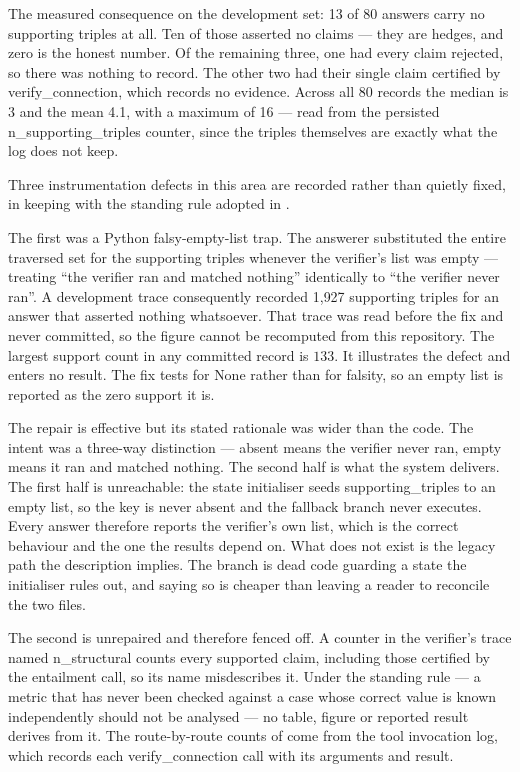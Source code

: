 The measured consequence on the development set: 13 of 80 answers carry no
supporting triples at all. Ten of those asserted no claims --- they are hedges,
and zero is the honest number. Of the remaining three, one had every claim
rejected, so there was nothing to record. The other two had their single
claim certified by \textsf{verify\_connection}, which records no evidence.
Across all 80 records the median is 3 and the mean 4.1, with a maximum of 16 ---
read from the persisted \textsf{n\_supporting\_triples} counter, since the
triples themselves are exactly what the log does not keep.

Three instrumentation defects in this area are recorded rather than quietly
fixed, in keeping with the standing rule adopted in
.

The first was a Python falsy-empty-list trap. The answerer substituted the
entire traversed set for the supporting triples whenever the verifier's list was
empty --- treating ``the verifier ran and matched nothing'' identically to ``the
verifier never ran''. A development trace consequently recorded 1{,}927
supporting triples for an answer that asserted nothing whatsoever. That trace
was read before the fix and never committed, so the figure cannot be recomputed
from this repository. The largest support count in any committed record is
$133$. It illustrates the defect and enters no result. The fix tests for
\textsf{None} rather than for falsity, so an empty list is reported as the zero
support it is.

The repair is effective but its stated rationale was wider than the code. The
intent was a three-way distinction --- absent means the verifier never ran,
empty means it ran and matched nothing. The second half is what the system
delivers. The first half is unreachable: the state initialiser seeds
\textsf{supporting\_triples} to an empty list, so the key is never absent and
the fallback branch never executes. Every answer therefore reports the
verifier's own list, which is the correct behaviour and the one the results
depend on. What does not exist is the legacy path the description implies. The
branch is dead code guarding a state the initialiser rules out, and saying so is
cheaper than leaving a reader to reconcile the two files.

The second is unrepaired and therefore fenced off. A counter in the verifier's
trace named \textsf{n\_structural} counts every supported claim, including those
certified by the entailment call, so its name misdescribes it. Under the
standing rule --- a metric that has never been checked against a case whose
correct value is known independently should not be analysed --- no table, figure
or reported result derives from it. The route-by-route counts of
 come from the tool invocation log, which records
each \textsf{verify\_connection} call with its arguments and result.

